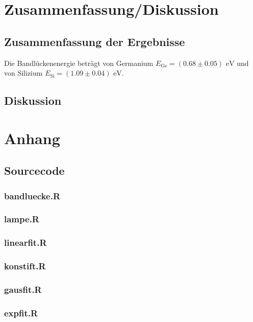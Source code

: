 \documentclass[12pt]{article}
\begin{document}
\newpage
\section{Zusammenfassung/Diskussion}

\subsection{Zusammenfassung der Ergebnisse}
Die Bandlückenenergie beträgt von Germanium $E_{\text{Ge}}=(0.68\pm0.05)\text{ eV}$ und von Silizium $E_{\text{Si}}=(1.09\pm0.04)\text{ eV}$.

\subsection{Diskussion}\label{Diskussion}


\newpage
\section{Anhang}

\subsection{Sourcecode}
\subsubsection{bandluecke.R}\label{srcbandluecke}

\subsubsection{lampe.R}\label{srclampe}

\subsubsection{linearfit.R}\label{srclinearfit}

\subsubsection{konstift.R}\label{srckonstfit}

\subsubsection{gausfit.R}\label{srcgausfit}

\subsubsection{expfit.R}\label{srcexpfit}

\end{document}
